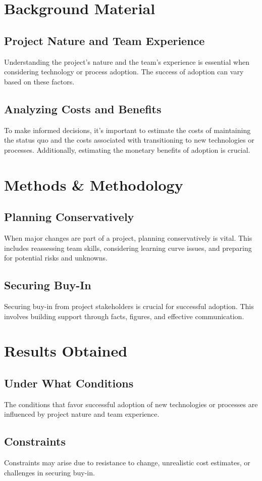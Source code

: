 \documentclass{article}
\begin{document}
\section{Background Material}
\subsection{Project Nature and Team Experience}
Understanding the project's nature and the team's experience is essential when considering technology or process adoption. The success of adoption can vary based on these factors.
\subsection{Analyzing Costs and Benefits}
To make informed decisions, it's important to estimate the costs of maintaining the status quo and the costs associated with transitioning to new technologies or processes. Additionally, estimating the monetary benefits of adoption is crucial.

\section{Methods \& Methodology}
\subsection{Planning Conservatively}
When major changes are part of a project, planning conservatively is vital. This includes reassessing team skills, considering learning curve issues, and preparing for potential risks and unknowns.
\subsection{Securing Buy-In}
Securing buy-in from project stakeholders is crucial for successful adoption. This involves building support through facts, figures, and effective communication.

\section{Results Obtained}
\subsection{Under What Conditions}
The conditions that favor successful adoption of new technologies or processes are influenced by project nature and team experience.
\subsection{Constraints}
Constraints may arise due to resistance to change, unrealistic cost estimates, or challenges in securing buy-in.
\end{document}
